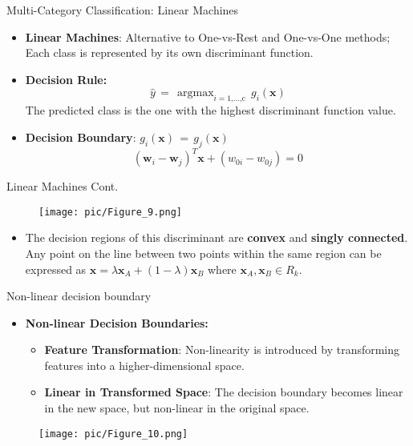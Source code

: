 \documentclass[serif, aspectratio=169]{beamer}
\DeclareMathOperator*{\argmax}{argmax}
\begin{document}
\begin{frame}{Multi-Category Classification: Linear Machines}
    \begin{itemize}\itemsep1.5em
        \item \justifying \textbf{Linear Machines}: Alternative to One-vs-Rest and One-vs-One methods; 
        Each class is represented by its own discriminant function.
        \item \justifying \textbf{Decision Rule:} 
        \[\hat{y} \, = \, \argmax_{i=\text{1,...,c}} \, g_i(\mathbf{x})\]
        The predicted class is the one with the highest discriminant function value.
        \item \textbf{Decision Boundary}:
        \(g_i(\mathbf{x}) \, = \, g_j(\mathbf{x})\)
        \[(\mathbf{w}_i - \mathbf{w}_j)^T\mathbf{x} + (w_{0i} - w_{0j}) = 0\]
    \end{itemize}
\end{frame}

\begin{frame}{Linear Machines Cont.}
    \begin{center}
            \begin{figure}[bh]
                \texttt{[image: pic/Figure\_9.png]}
            \end{figure}
        \endminipage
    \end{center}
    \hspace{4cm}
    \begin{itemize}\itemsep1.5em
        \item \justifying The decision regions of this discriminant are \textbf{convex} and \textbf{singly connected}. Any point on the line between two points within the same region can be expressed as 
\(
\mathbf{x} = \lambda \mathbf{x}_A + (1 - \lambda) \mathbf{x}_B
\)
where \( \mathbf{x}_A, \mathbf{x}_B \in R_k \).

    \end{itemize}
\end{frame}

\begin{frame}{Non-linear decision boundary}
    \begin{itemize}
        \item \textbf{Non-linear Decision Boundaries:}
        \begin{itemize}\itemsep1em
            \item \justifying \textbf{Feature Transformation}: Non-linearity is introduced by transforming features into a higher-dimensional space.
            \item \justifying \textbf{Linear in Transformed Space}: The decision boundary becomes linear in the new space, but non-linear in the original space.
        \end{itemize}
    \end{itemize}
    \endminipage
    \hfill
        \begin{figure}[bh]
            \texttt{[image: pic/Figure\_10.png]}
        \end{figure}
    \endminipage
\end{frame}
\end{document}
